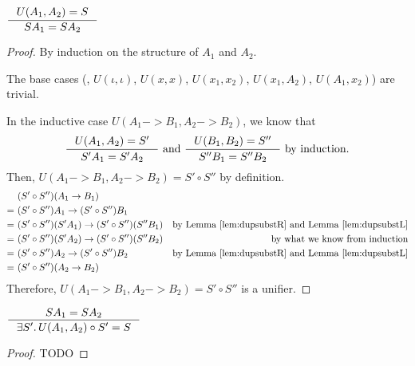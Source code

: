 \begin{theorem}[$U$ is sound] \label{prop:soundU}
$ \inference{U(A_1,A_2)=S}{S A_1 = S A_2} $
\end{theorem}
\begin{proof}
By induction on the structure of $A_1$ and $A_2$.

The base cases (\ie, $U(\iota,\iota)$, $U(x,x)$, $U(x_1,x_2)$,
			$U(x_1,A_2)$, $U(A_1,x_2)$) are trivial.

In the inductive case $U(A_1 -> B_1, A_2 -> B_2)$, we know that
\[ \inference{U(A_1,A_2)=S' }{S'  A_1 = S'  A_2} ~\text{and}~
   \inference{U(B_1,B_2)=S''}{S'' B_1 = S'' B_2} ~\text{by induction.}
\]
Then, $U(A_1 -> B_1, A_2 -> B_2)=S'\circ S''$ by definition.
\begin{align*}
 &~(S'\circ S'')(A_1 -> B_1) \\
=&~ (S'\circ S'') A_1 -> (S'\circ S'') B_1 \\
=&~ (S'\circ S'')(S' A_1) -> (S'\circ S'')(S'' B_1)
 & \text{by Lemma \ref{lem:dupsubstR} and Lemma \ref{lem:dupsubstL}} \\
=&~ (S'\circ S'')(S' A_2) -> (S'\circ S'')(S'' B_2)
 & \text{by what we know from induction} \\
=&~ (S'\circ S'') A_2 -> (S'\circ S'') B_2
 & \text{by Lemma \ref{lem:dupsubstR} and Lemma \ref{lem:dupsubstL}} \\
=&~ (S'\circ S'')(A_2 -> B_2)
\end{align*}
Therefore, $U(A_1 -> B_1, A_2 -> B_2)=S'\circ S''$ is a unifier.
\end{proof}

\begin{theorem}[$U$ is complete] \label{prop:completeU}
$ \inference{S A_1 = S A_2}{\exists S'.\, U(A_1,A_2)\circ S' = S} $
\end{theorem}
\begin{proof}
	TODO
\end{proof}


